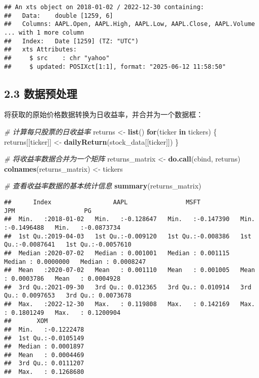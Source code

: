 \documentclass[
]{article}
\newenvironment{Shaded}{\begin{snugshade}}{\end{snugshade}}
\newcommand{\CommentTok}[1]{\textcolor[rgb]{0.56,0.35,0.01}{\textit{#1}}}
\newcommand{\ControlFlowTok}[1]{\textcolor[rgb]{0.13,0.29,0.53}{\textbf{#1}}}
\newcommand{\FunctionTok}[1]{\textcolor[rgb]{0.13,0.29,0.53}{\textbf{#1}}}
\newcommand{\NormalTok}[1]{#1}
\newcommand{\OtherTok}[1]{\textcolor[rgb]{0.56,0.35,0.01}{#1}}
\begin{document}
\begin{verbatim}
## An xts object on 2018-01-02 / 2022-12-30 containing: 
##   Data:    double [1259, 6]
##   Columns: AAPL.Open, AAPL.High, AAPL.Low, AAPL.Close, AAPL.Volume ... with 1 more column
##   Index:   Date [1259] (TZ: "UTC")
##   xts Attributes:
##     $ src    : chr "yahoo"
##     $ updated: POSIXct[1:1], format: "2025-06-12 11:58:50"
\end{verbatim}

\subsection{2.3 数据预处理}\label{ux6570ux636eux9884ux5904ux7406}

将获取的原始价格数据转换为日收益率，并合并为一个数据框：

\begin{Shaded}
\begin{Highlighting}[]
\CommentTok{\# 计算每只股票的日收益率}
\NormalTok{returns }\OtherTok{\textless{}{-}} \FunctionTok{list}\NormalTok{()}
\ControlFlowTok{for}\NormalTok{(ticker }\ControlFlowTok{in}\NormalTok{ tickers) \{}
\NormalTok{  returns[[ticker]] }\OtherTok{\textless{}{-}} \FunctionTok{dailyReturn}\NormalTok{(stock\_data[[ticker]])}
\NormalTok{\}}

\CommentTok{\# 将收益率数据合并为一个矩阵}
\NormalTok{returns\_matrix }\OtherTok{\textless{}{-}} \FunctionTok{do.call}\NormalTok{(cbind, returns)}
\FunctionTok{colnames}\NormalTok{(returns\_matrix) }\OtherTok{\textless{}{-}}\NormalTok{ tickers}

\CommentTok{\# 查看收益率数据的基本统计信息}
\FunctionTok{summary}\NormalTok{(returns\_matrix)}
\end{Highlighting}
\end{Shaded}

\begin{verbatim}
##      Index                 AAPL                MSFT                JPM                   PG            
##  Min.   :2018-01-02   Min.   :-0.128647   Min.   :-0.147390   Min.   :-0.1496488   Min.   :-0.0873734  
##  1st Qu.:2019-04-03   1st Qu.:-0.009120   1st Qu.:-0.008386   1st Qu.:-0.0087641   1st Qu.:-0.0057610  
##  Median :2020-07-02   Median : 0.001001   Median : 0.001115   Median : 0.0000000   Median : 0.0008247  
##  Mean   :2020-07-02   Mean   : 0.001110   Mean   : 0.001005   Mean   : 0.0003786   Mean   : 0.0004928  
##  3rd Qu.:2021-09-30   3rd Qu.: 0.012365   3rd Qu.: 0.010914   3rd Qu.: 0.0097653   3rd Qu.: 0.0073678  
##  Max.   :2022-12-30   Max.   : 0.119808   Max.   : 0.142169   Max.   : 0.1801249   Max.   : 0.1200904  
##       XOM            
##  Min.   :-0.1222478  
##  1st Qu.:-0.0105149  
##  Median : 0.0001897  
##  Mean   : 0.0004469  
##  3rd Qu.: 0.0111207  
##  Max.   : 0.1268680
\end{verbatim}
\end{document}
